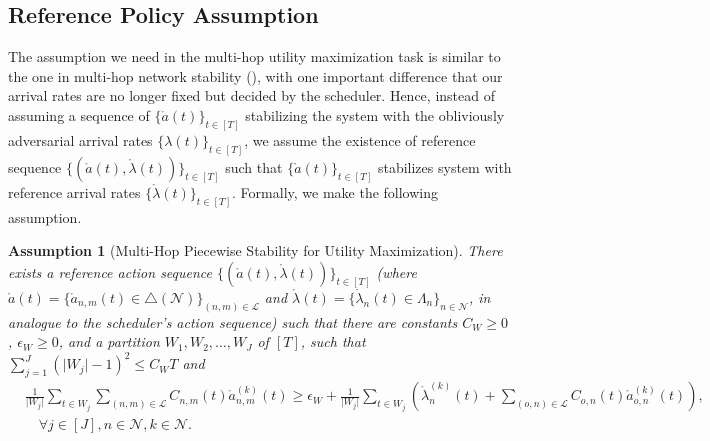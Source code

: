 \documentclass[11pt,fullpage,letterpaper]{article} %
\newtheorem{assumption}{Assumption}
\renewcommand{\bm}[1]{#1}%
\newcommand{\mN}{{\mathcal N}}
\newcommand{\mL}{{\mathcal L}}
\begin{document}
\subsection{Reference Policy Assumption}\label{sec:multi-hop utility assumption}
The assumption we need in the multi-hop utility maximization task is similar to the one in multi-hop network stability (), with one important difference that our arrival rates are no longer fixed but decided by the scheduler. Hence, instead of assuming a sequence of $\{\mathring{\bm a}(t)\}_{t\in [T]}$ stabilizing the system with the obliviously adversarial arrival rates $\{\bm \lambda(t)\}_{t\in [T]}$, we assume the existence of reference sequence $\{(\mathring{\bm a}(t),\mathring{\bm \lambda}(t))\}_{t\in [T]}$ such that $\{\mathring{\bm a}(t)\}_{t\in [T]}$ stabilizes system with reference arrival rates $\{\mathring{\bm \lambda}(t)\}_{t\in [T]}$. Formally, we make the following assumption.
\begin{assumption}[Multi-Hop Piecewise Stability for Utility Maximization]\label{def:multi-hop utility network stability}
There exists a {reference action sequence} $\{(\mathring{\bm a}(t),\mathring{\bm \lambda}(t))\}_{t\in [T]}$ (where $\mathring{\bm a}(t)=\{\mathring{\bm a}_{n,m}(t)\in \triangle(\mN)\}_{(n,m)\in \mL}$ and $\mathring{\bm \lambda}(t)=\{\mathring{\bm \lambda}_n(t)\in \Lambda_n\}_{n\in \mN}$, in analogue to the scheduler's action sequence) such that there are constants $C_W\ge 0$, $\epsilon_W\ge 0$, and a partition $W_1,W_2,\ldots,W_J$ of $[T]$, such that $\sum_{j=1}^J (\lvert W_j\rvert-1)^2\le C_W T$ and
\begin{align*}
&\frac{1}{\lvert W_j\rvert} \sum_{t\in W_j} \sum_{(n,m)\in \mL} C_{n,m}(t) \mathring a_{n,m}^{(k)}(t) \ge \epsilon_W + \frac{1}{\lvert W_j\rvert} \sum_{t\in W_j} \left (\mathring \lambda_n^{(k)}(t) + \sum_{(o,n)\in \mL} C_{o,n}(t) \mathring a_{o,n}^{(k)}(t)\right ),\\
&\quad \forall j\in [J],n\in \mN,k\in \mN.
\end{align*}
\end{assumption}
\end{document}
